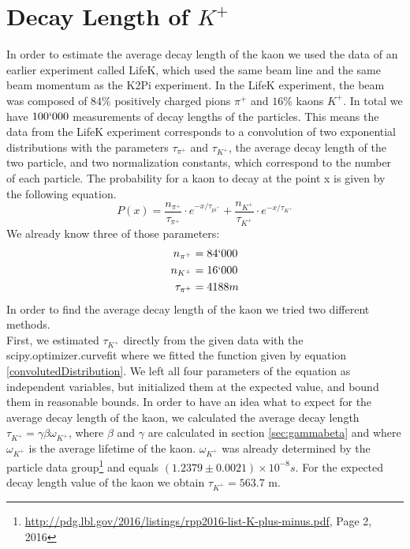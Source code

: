 \documentclass[a4paper,parskip,11pt, DIV12]{scrreprt}
\begin{document}
	\clearpage
	
	\chapter{Decay Length of $K^+$}
	
	In order to estimate the average decay length of the kaon we used the data of an earlier experiment called LifeK, which used the same beam line and the same beam momentum as the K2Pi experiment. In the LifeK experiment, the beam was composed of $84\%$ positively charged pions $\pi^+$ and $16\%$ kaons $K^+$. In total we have $100`000$ measurements of decay lengths of the particles. This means the data from the LifeK experiment corresponds to a convolution of two exponential distributions with the parameters $\tau_{\pi^+}$ and $\tau_{K^+}$, the average decay length of the two particle, and two normalization constants, which correspond to the number of each particle. The probability for a kaon to decay at the point x is given by the following equation.
	\begin{equation}
	\label{convolutedDistribution}
	P(x)=  \frac{n_{\pi^+}}{\tau_{\pi^+}} \cdot e^{-x/ \tau_{pi^+}} + \frac{n_{K^+}}{\tau_{K^+}} \cdot e^{-x/ \tau_{K^+}}
	\end{equation} 
	We already know three of those parameters:
	\begin{align*}
	n_{\pi^+} &= 84`000 \\
	n_{K^+} &= 16`000 \\
	\tau_{\pi^+} &= 4188 m
	\end{align*}
	In order to find the average decay length of the kaon we tried two different methods.\\
	First, we estimated $\tau_{K^+}$ directly from the given data with the scipy.optimizer.curvefit where we fitted the function given by equation \ref{convolutedDistribution}. We left all four parameters of the equation as independent variables, but initialized them at the expected value, and bound them in reasonable bounds. In order to have an idea what to expect for the average decay length of the kaon, we calculated the average decay length $\tau_{K^+}= \gamma \beta \omega_{K^+}$, where $\beta$ and $\gamma$ are calculated in section \ref{sec:gammabeta} and where  $\omega_{K^+}$ is the average lifetime of the kaon. $\omega_{K^+}$ was already determined by the particle data group\footnote{\url{http://pdg.lbl.gov/2016/listings/rpp2016-list-K-plus-minus.pdf}, Page 2, 2016} and equals  $(1.2379 \pm 0.0021) \times 10^{-8} s $. For the expected decay length value of the kaon we obtain $\tau_{K^+} = 563.7$ m.
	
\end{document}
